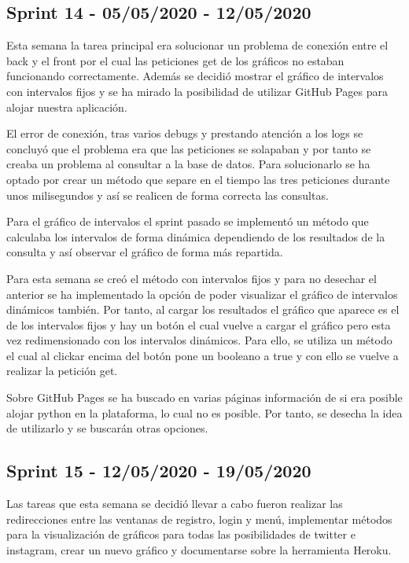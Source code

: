 
\subsection{Sprint 14 - 05/05/2020 - 12/05/2020}
Esta semana la tarea principal era solucionar un problema de conexión entre el back y el front por el cual las peticiones get de los gráficos no estaban funcionando correctamente. Además se decidió mostrar el gráfico de intervalos con intervalos fijos y se ha mirado la posibilidad de utilizar GitHub Pages para alojar nuestra aplicación.

El error de conexión, tras varios debugs y prestando atención a los logs se concluyó que el problema era que las peticiones se solapaban y por tanto se creaba un problema al consultar a la base de datos.
Para solucionarlo se ha optado por crear un método que separe en el tiempo las tres peticiones durante unos milisegundos y así se realicen de forma correcta las consultas.

Para el gráfico de intervalos el sprint pasado se implementó un método que calculaba los intervalos de forma dinámica dependiendo de los resultados de la consulta y así observar el gráfico de forma más repartida. 

Para esta semana se creó el método con intervalos fijos y para no desechar el anterior se ha implementado la opción de poder visualizar el gráfico de intervalos dinámicos también.
Por tanto, al cargar los resultados el gráfico que aparece es el de los intervalos fijos y hay un botón el cual vuelve a cargar el gráfico pero esta vez redimensionado con los intervalos dinámicos. Para ello, se utiliza un método el cual al clickar encima del botón pone un booleano a true y con ello se vuelve a realizar la petición get.

Sobre GitHub Pages se ha buscado en varias páginas información de si era posible alojar python en la plataforma, lo cual no es posible. Por tanto, se desecha la idea de utilizarlo y se buscarán otras opciones.


\subsection{Sprint 15 - 12/05/2020 - 19/05/2020}
Las tareas que esta semana se decidió llevar a cabo fueron realizar las redirecciones entre las ventanas de registro, login y menú, implementar métodos para la visualización de gráficos para todas las posibilidades de twitter e instagram, crear un nuevo gráfico y documentarse sobre la herramienta Heroku.

